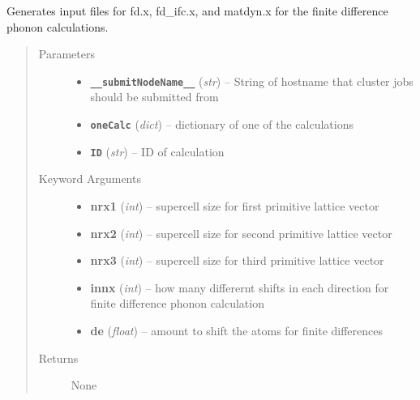 \documentclass[letterpaper,10pt,english]{sphinxmanual}
\begin{document}
\begin{fulllineitems}
\label{run:run.prep_fd}
Generates input files for fd.x, fd\_ifc.x, and matdyn.x for the finite
difference phonon calculations.
\begin{quote}\begin{description}
\item[{Parameters}] \leavevmode\begin{itemize}
\item {} 
\textbf{\texttt{\_\_submitNodeName\_\_}} (\emph{str}) -- String of hostname that cluster jobs should be submitted from

\item {} 
\textbf{\texttt{oneCalc}} (\emph{dict}) -- dictionary of one of the calculations

\item {} 
\textbf{\texttt{ID}} (\emph{str}) -- ID of calculation

\end{itemize}

\item[{Keyword Arguments}] \leavevmode\begin{itemize}
\item {} 
\textbf{nrx1} (\emph{int}) --
supercell size for first primitive lattice vector

\item {} 
\textbf{nrx2} (\emph{int}) --
supercell size for second primitive lattice vector

\item {} 
\textbf{nrx3} (\emph{int}) --
supercell size for third primitive lattice vector

\item {} 
\textbf{innx} (\emph{int}) --
how many differernt shifts in each direction for
finite difference phonon calculation

\item {} 
\textbf{de} (\emph{float}) --
amount to shift the atoms for finite differences

\end{itemize}

\item[{Returns}] \leavevmode
None

\end{description}\end{quote}

\end{fulllineitems}
\end{document}
